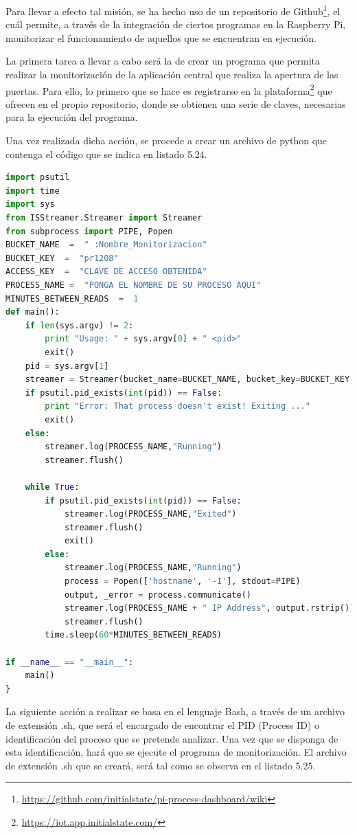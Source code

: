 Para llevar a efecto tal misión, se ha hecho uso de un repositorio de Github\footnote{\url{https://github.com/initialstate/pi-process-dashboard/wiki}}, el cuál permite, a través de la integración de ciertos programas en la Raspberry Pi, monitorizar el funcionamiento de aquellos que se encuentran en ejecución.

La primera tarea a llevar a cabo será la de crear un programa que permita realizar la monitorización de la aplicación central que realiza la apertura de las puertas. Para ello, lo primero que se hace es registrarse en la plataforma\footnote{\url{https://iot.app.initialstate.com/}} que ofrecen en el propio repositorio, donde se obtienen una serie de claves, necesarias para la ejecución del programa.

Una vez realizada dicha acción, se procede a crear un archivo de python que contenga el código que se indica en listado 5.24.

\begin{lstlisting}[language=Python,
    caption={Monitorización de un proceso},
    label=src:monitorizacion-de-un-proceso
]
import psutil
import time
import sys
from ISStreamer.Streamer import Streamer
from subprocess import PIPE, Popen
BUCKET_NAME  =  " :Nombre_Monitorizacion" 
BUCKET_KEY  =  "pr1208"
ACCESS_KEY  =  "CLAVE DE ACCESO OBTENIDA"
PROCESS_NAME =  "PONGA EL NOMBRE DE SU PROCESO AQUI" 
MINUTES_BETWEEN_READS  =  1
def main():
	if len(sys.argv) != 2:
		print "Usage: " + sys.argv[0] + " <pid>"
		exit()
	pid = sys.argv[1]
	streamer = Streamer(bucket_name=BUCKET_NAME, bucket_key=BUCKET_KEY, access_key=ACCESS_KEY)
	if psutil.pid_exists(int(pid)) == False:
		print "Error: That process doesn't exist! Exiting ..."
		exit()
	else:
		streamer.log(PROCESS_NAME,"Running")
		streamer.flush()

	while True:
		if psutil.pid_exists(int(pid)) == False:
			streamer.log(PROCESS_NAME,"Exited")
			streamer.flush()
			exit()
		else:
			streamer.log(PROCESS_NAME,"Running")
			process = Popen(['hostname', '-I'], stdout=PIPE)
			output, _error = process.communicate()
			streamer.log(PROCESS_NAME + " IP Address", output.rstrip())
			streamer.flush()
		time.sleep(60*MINUTES_BETWEEN_READS)

if __name__ == "__main__":
    main()
}
\end{lstlisting}

La siguiente acción a realizar se basa en el lenguaje Bash, a través de un archivo de extensión .sh, que será el encargado de encontrar el PID (Process ID) o identificación del proceso que se pretende analizar. Una vez que se disponga de esta identificación, hará que se ejecute el programa de monitorización. El archivo de extensión .sh que se creará, será tal como se observa en el listado 5.25.

